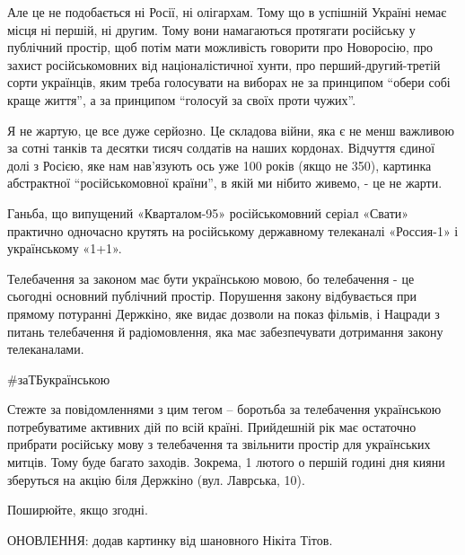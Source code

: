 Але це не подобається ні Росії, ні олігархам. Тому що в успішній Україні немає
місця ні першій, ні другим. Тому вони намагаються протягати російську у
публічний простір, щоб потім мати можливість говорити про Новоросію, про захист
російськомовних від націоналістичної хунти, про перший-другий-третій сорти
українців, яким треба голосувати на виборах не за принципом \enquote{обери собі краще
життя}, а за принципом \enquote{голосуй за своїх проти чужих}.

Я не жартую, це все дуже серйозно. Це складова війни, яка є не менш важливою за
сотні танків та десятки тисяч солдатів на наших кордонах. Відчуття єдиної долі
з Росією, яке нам нав'язують ось уже 100 років (якщо не 350), картинка
абстрактної \enquote{російськомовної країни}, в якій ми нібито живемо, - це не жарти.

Ганьба, що випущений «Кварталом-95» російськомовний серіал «Свати» практично
одночасно крутять на російському державному телеканалі «Россия-1» і
українському «1+1».

Телебачення за законом має бути українською мовою, бо телебачення - це
сьогодні основний публічний простір. Порушення закону відбувається при прямому
потуранні  Держкіно, яке видає дозволи на показ фільмів, і Нацради з питань
телебачення й радіомовлення, яка має забезпечувати дотримання закону
телеканалами.

\#заТБукраїнською

Стежте за повідомленнями з цим тегом – боротьба за телебачення українською
потребуватиме активних дій по всій країні. Прийдешній рік має остаточно
прибрати російську мову з телебачення та звільнити простір для українських
митців. Тому буде багато заходів. Зокрема, 1 лютого о першій годині дня кияни
зберуться на акцію біля Держкіно (вул. Лаврська, 10). 

Поширюйте, якщо згодні.

ОНОВЛЕННЯ: додав картинку від шановного Нікіта Тітов.
